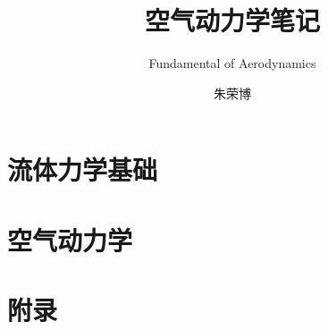 \documentclass[lang=cn,source,XITS,zihao=-4,scheme=chinese,draft]{elegantbook}
\title{空气动力学笔记}
\subtitle{Fundamental of Aerodynamics}
\author{朱荣博}
\begin{document}
\maketitle
\frontmatter

{\centering\color{titleblue}\tableofcontents}

\mainmatter

\part{流体力学基础}





\part{空气动力学}



\part{附录}
\appendix


\end{document}
